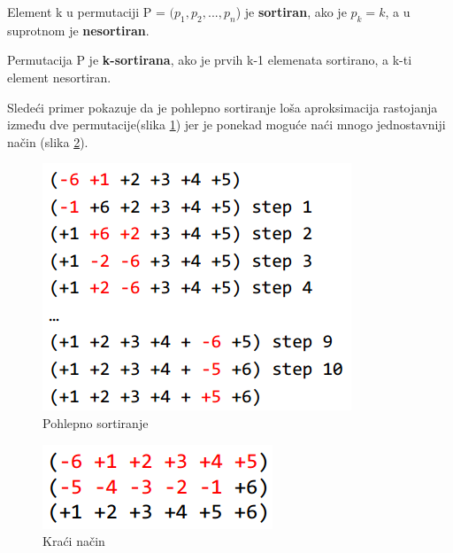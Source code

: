 \begin{definicija}{Element k u permutaciji P = $(p_1, p_2, ..., p_n$) je \textbf{sortiran}, ako je $p_k = k$, a u suprotnom je \textbf{nesortiran}.}
\end{definicija}

\begin{definicija}{Permutacija P je \textbf{k-sortirana}, ako je prvih k-1 elemenata sortirano, a k-ti element nesortiran.}
\end{definicija}

\noindent Sledeći primer pokazuje da je pohlepno sortiranje loša aproksimacija rastojanja između dve permutacije(slika \ref{slika:losa}) jer je ponekad moguće naći mnogo jednostavniji način (slika \ref{slika:kraci nacin}).



\begin{minipage}{\textwidth}
	\centering
	\begin{minipage}{0.5\textwidth} 
		\begin{figure}[H]
			\centering
			\includegraphics[width=\textwidth]{poglavlja/6/slike/los_greedy.PNG}
			\caption{Pohlepno sortiranje}
			\label{slika:losa}
		\end{figure}
		
	\end{minipage}
	\hfill 
	\begin{minipage}{0.4\textwidth}
		\begin{figure}[H]
			\centering
			\includegraphics[width=\textwidth]{poglavlja/6/slike/kraci.PNG}
			\vspace*{10em}
			\caption{Kraći način}
			\label{slika:kraci nacin}
		\end{figure}
		

\end{minipage}
\end{minipage}
